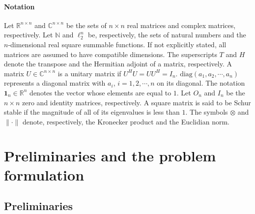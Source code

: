 \documentclass[a4paper,10pt,onecolumn]{article}
\begin{document}
\paragraph*{Notation} Let $\mathbb{R}^{n\times n}$ and $\mathbb{C}^{n\times
  n}$ be the sets of $n\times n$ real
matrices and complex matrices, respectively. Let $\mathbb{N}$ and
$\ell_2^{n}$ be, respectively, the sets of natural numbers and the
$n$-dimensional real square summable
functions. If not explicitly stated, all matrices are assumed to have
compatible dimensions. The superscripts $T$ and $H$ denote the transpose
and the Hermitian adjoint of a matrix, respectively. A matrix $U\in
\mathbb{C}^{n\times n}$ is a unitary matrix if $U^{H}U =UU^{H} =
I_n$. $\mathrm{diag}(a_{1},a_{2},\cdots,a_{n})$ represents a diagonal
matrix with $a_{i}$, $i=1,2,\cdots,n$ on its diagonal. The notation
$\textbf{1}_{n}\in \mathbb{R}^{n}$ denotes the vector whose elements are
equal to $1$. Let $O_{n}$ and $I_{n}$ be the $n\times n$ zero and identity
matrices, respectively.  A square matrix is said to be Schur stable if the
magnitude of all of
its eigenvalues is less than $1$.
The symbols $\otimes$ and $\|\cdot\|$ denote, respectively, the Kronecker
product and the Euclidian norm.


\section{Preliminaries and the problem formulation}

\subsection{Preliminaries}
\end{document}
